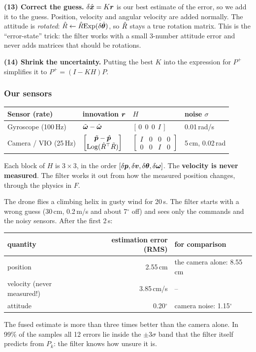 \textbf{(13) Correct the guess.} $\delta\hat{\bm{x}}=K\bm{r}$ is our best estimate of the error, so we add it to the guess.
Position, velocity and angular velocity are added normally. The attitude is \emph{rotated}: $\hat{R}\leftarrow\hat{R}\mathrm{Exp}(\delta\hat{\bm{\theta}})$,
so $\hat{R}$ stays a true rotation matrix. This is the ``error-state'' trick: the filter works with a small 3-number
attitude error and never adds matrices that should be rotations.

\textbf{(14) Shrink the uncertainty.} Putting the best $K$ into the expression for $P^+$ simplifies it to
$P^+=(I-KH)P$.

\subsubsection*{Our sensors}
\begin{center}\small
\begin{tabular}{@{}llll@{}}
\toprule
Sensor (rate) & innovation $\bm{r}$ & $H$ & noise $\sigma$\\
\midrule
Gyroscope (100\,Hz) & $\tilde{\bm{\omega}}-\hat{\bm\omega}$ & $[\,0\ \ 0\ \ 0\ \ I\,]$ & 0.01\,rad/s\\
Camera / VIO (25\,Hz) & $\begin{bmatrix}\tilde{\bm{p}}-\hat{\bm p}\\ \mathrm{Log}(\hat{R}^\top\tilde R)\end{bmatrix}$ &
  $\begin{bmatrix}I&0&0&0\\0&0&I&0\end{bmatrix}$ & 5\,cm, 0.02\,rad\\
\bottomrule
\end{tabular}
\end{center}
Each block of $H$ is $3\times3$, in the order $[\delta\bm{p},\delta\bm{v},\delta\bm{\theta},\delta\bm{\omega}]$. The \textbf{velocity is never
measured}. The filter works it out from how the measured position changes, through the physics in $F$.

\begin{toy}
The drone flies a climbing helix in gusty wind for 20\,s. The filter starts with a wrong guess (30\,cm, 0.2\,m/s and
about 7$^\circ$ off) and sees only the commands and the noisy sensors. After the first 2\,s:
\begin{center}\small
\begin{tabular}{lrl}
\toprule
quantity & estimation error (RMS) & for comparison\\
\midrule
position & 2.55\,cm & the camera alone: 8.55\,cm\\
velocity (never measured!) & 3.85\,cm/s & --\\
attitude & 0.20$^\circ$ & camera noise: 1.15$^\circ$\\
\bottomrule
\end{tabular}
\end{center}
The fused estimate is more than three times better than the camera alone. In 99\% of the samples all 12 errors lie
inside the $\pm3\sigma$ band that the filter itself predicts from $P_k$: the filter knows how unsure it is.
\end{toy}

